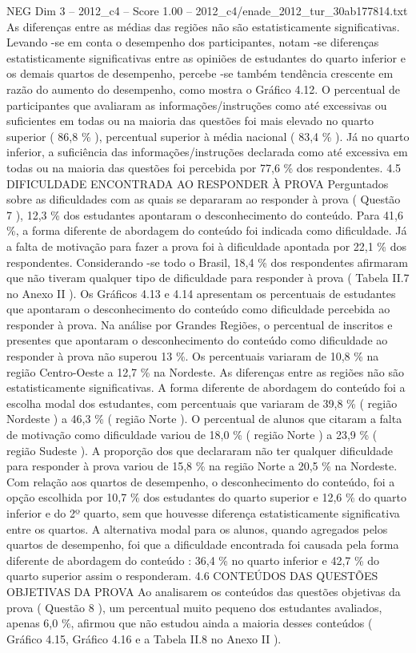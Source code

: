 \begin{textsample}{NEG Dim 3 – 2012\_c4 – Score 1.00 – 2012\_c4/enade\_2012\_tur\_30ab177814.txt}
As diferenças entre as médias das regiões não são estatisticamente significativas.
Levando -se em conta o desempenho dos participantes, notam -se diferenças estatisticamente significativas entre as opiniões de estudantes do quarto inferior e os demais quartos de desempenho, percebe -se também tendência crescente em razão do aumento do desempenho, como mostra o Gráfico 4.12.
O percentual de participantes que avaliaram as informações/instruções como até excessivas ou suficientes em todas ou na maioria das questões foi mais elevado no quarto superior ( 86,8 \% ), percentual superior à média nacional ( 83,4 \% ).
Já no quarto inferior, a suficiência das informações/instruções declarada como até excessiva em todas ou na maioria das questões foi percebida por 77,6 \% dos respondentes. 4.5 DIFICULDADE ENCONTRADA AO RESPONDER À PROVA Perguntados sobre as dificuldades com as quais se depararam ao responder à prova ( Questão 7 ), 12,3 \% dos estudantes apontaram o desconhecimento do conteúdo.
Para 41,6 \%, a forma diferente de abordagem do conteúdo foi indicada como dificuldade.
Já a falta de motivação para fazer a prova foi à dificuldade apontada por 22,1 \% dos respondentes.
Considerando -se todo o Brasil, 18,4 \% dos respondentes afirmaram que não tiveram qualquer tipo de dificuldade para responder à prova ( Tabela II.7 no Anexo II ).
Os Gráficos 4.13 e 4.14 apresentam os percentuais de estudantes que apontaram o desconhecimento do conteúdo como dificuldade percebida ao responder à prova.
Na análise por Grandes Regiões, o percentual de inscritos e presentes que apontaram o desconhecimento do conteúdo como dificuldade ao responder à prova não superou 13 \%.
Os percentuais variaram de 10,8 \% na região Centro-Oeste a 12,7 \% na Nordeste.
As diferenças entre as regiões não são estatisticamente significativas.
A forma diferente de abordagem do conteúdo foi a escolha modal dos estudantes, com percentuais que variaram de 39,8 \% ( região Nordeste ) a 46,3 \% ( região Norte ).
O percentual de alunos que citaram a falta de motivação como dificuldade variou de 18,0 \% ( região Norte ) a 23,9 \% ( região Sudeste ).
A proporção dos que declararam não ter qualquer dificuldade para responder à prova variou de 15,8 \% na região Norte a 20,5 \% na Nordeste.
Com relação aos quartos de desempenho, o desconhecimento do conteúdo, foi a opção escolhida por 10,7 \% dos estudantes do quarto superior e 12,6 \% do quarto inferior e do 2º quarto, sem que houvesse diferença estatisticamente significativa entre os quartos.
A alternativa modal para os alunos, quando agregados pelos quartos de desempenho, foi que a dificuldade encontrada foi causada pela forma diferente de abordagem do conteúdo : 36,4 \% no quarto inferior e 42,7 \% do quarto superior assim o responderam. 4.6 CONTEÚDOS DAS QUESTÕES OBJETIVAS DA PROVA Ao analisarem os conteúdos das questões objetivas da prova ( Questão 8 ), um percentual muito pequeno dos estudantes avaliados, apenas 6,0 \%, afirmou que não estudou ainda a maioria desses conteúdos ( Gráfico 4.15, Gráfico 4.16 e a Tabela II.8 no Anexo II ).

\end{textsample}
